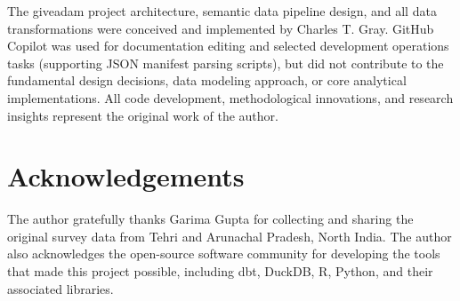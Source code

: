 \documentclass{article}
\begin{document}
The giveadam project architecture, semantic data pipeline design, and all data transformations were conceived and implemented by Charles T. Gray. GitHub Copilot \cite{copilot} was used for documentation editing and selected development operations tasks (supporting JSON manifest parsing scripts), but did not contribute to the fundamental design decisions, data modeling approach, or core analytical implementations. All code development, methodological innovations, and research insights represent the original work of the author.

\section{Acknowledgements}

The author gratefully thanks Garima Gupta for collecting and sharing the original survey data from Tehri and Arunachal Pradesh, North India. The author also acknowledges the open-source software community for developing the tools that made this project possible, including dbt, DuckDB, R, Python, and their associated libraries.



\end{document}
